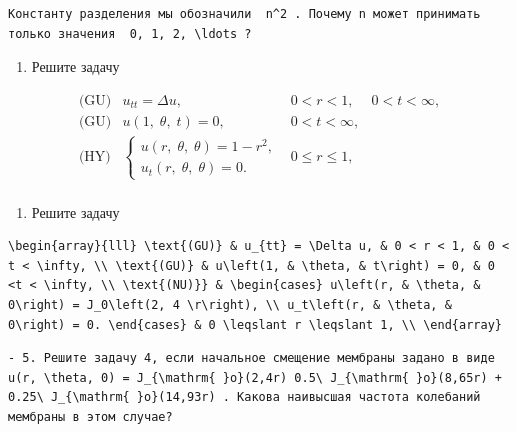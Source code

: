 \documentclass[
  ukrainian,
]{article}
\providecommand{\tightlist}{%
  \setlength{\itemsep}{0pt}\setlength{\parskip}{0pt}}
\begin{document}
\begin{verbatim}
Константу разделения мы обозначили  n^2 . Почему n может принимать только значения  0, 1, 2, \ldots ?
\end{verbatim}

\begin{enumerate}
\def\labelenumi{\arabic{enumi}.}
\setcounter{enumi}{2}
\tightlist
\item
  Решите задачу
\end{enumerate}

\[
\begin{array}{lll} \text{(GU)} & u_{tt} = \Delta u, & 0 < r < 1, & 0 < t < \infty, \\ \text{(GU)} & u\left(1, \; \theta, \; t\right) = 0, & 0 < t < \infty, \\ \text{(HY)} & \begin{cases} u\left(r, \; \theta, \; \theta\right) = 1 - r^2, \\ u_t\left(r, \; \theta, \; \theta\right) = 0. \end{cases} & 0 \leqslant r \leqslant 1, \\ \end{array}
\]

\begin{enumerate}
\def\labelenumi{\arabic{enumi}.}
\setcounter{enumi}{3}
\tightlist
\item
  Решите задачу
\end{enumerate}

\begin{verbatim}
\begin{array}{lll} \text{(GU)} & u_{tt} = \Delta u, & 0 < r < 1, & 0 < t < \infty, \\ \text{(GU)} & u\left(1, & \theta, & t\right) = 0, & 0 <t < \infty, \\ \text{(NU)}} & \begin{cases} u\left(r, & \theta, & 0\right) = J_0\left(2, 4 \r\right), \\ u_t\left(r, & \theta, & 0\right) = 0. \end{cases} & 0 \leqslant r \leqslant 1, \\ \end{array}
\end{verbatim}

\begin{verbatim}
- 5. Решите задачу 4, если начальное смещение мембраны задано в виде  u(r, \theta, 0) = J_{\mathrm{ }o}(2,4r) 0.5\ J_{\mathrm{ }o}(8,65r) + 0.25\ J_{\mathrm{ }o}(14,93r) . Какова наивысшая частота колебаний мембраны в этом случае?
\end{verbatim}
\end{document}
